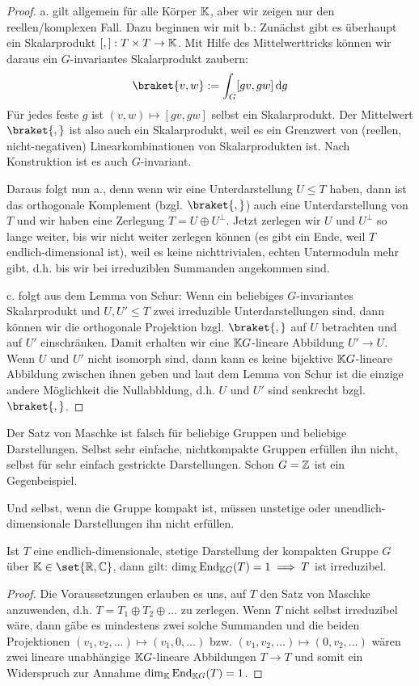 \begin{proof}
a. gilt allgemein für alle Körper $\mathbb{K}$, aber wir zeigen nur den reellen/komplexen Fall. Dazu beginnen wir mit b.: Zunächst gibt es überhaupt ein Skalarprodukt $[,]: T\times T\to\mathbb{K}$. Mit Hilfe des Mittelwerttricks können wir daraus ein $G$-invariantes Skalarprodukt zaubern:
\[\braket{v,w} := \int_G [gv,gw] \dd g\]
Für jedes feste $g$ ist $(v,w) \mapsto [gv,gw]$ selbst ein Skalarprodukt. Der Mittelwert $\braket{,}$ ist also auch ein Skalarprodukt, weil es ein Grenzwert von (reellen, nicht-negativen) Linearkombinationen von Skalarprodukten ist. Nach Konstruktion ist es auch $G$-invariant.

\smallbreak
Daraus folgt nun a., denn wenn wir eine Unterdarstellung $U\leq T$ haben, dann ist das orthogonale Komplement (bzgl. $\braket{,}$) auch eine Unterdarstellung von $T$ und wir haben eine Zerlegung $T=U\oplus U^\perp$. Jetzt zerlegen wir $U$ und $U^\perp$ so lange weiter, bis wir nicht weiter zerlegen können (es gibt ein Ende, weil $T$ endlich-dimensional ist), weil es keine nichttrivialen, echten Untermoduln mehr gibt, d.h. bis wir bei irreduziblen Summanden angekommen sind.

\smallbreak
c. folgt aus dem Lemma von Schur: Wenn ein beliebiges $G$-invariantes Skalarprodukt und $U,U'\leq T$ zwei irreduzible Unterdarstellungen sind, dann können wir die orthogonale Projektion bzgl. $\braket{,}$ auf $U$ betrachten und auf $U'$ einschränken. Damit erhalten wir eine $\mathbb{K} G$-lineare Abbildung $U'\to U$. Wenn $U$ und $U'$ nicht isomorph sind, dann kann es keine bijektive $\mathbb{K} G$-lineare Abbildung zwischen ihnen geben und laut dem Lemma von Schur ist die einzige andere Möglichkeit die Nullabbldung, d.h. $U$ und $U'$ sind senkrecht bzgl. $\braket{,}$.
\end{proof}

\begin{remark}
Der Satz von Maschke ist falsch für beliebige Gruppen und beliebige Darstellungen. Selbst sehr einfache, nichtkompakte Gruppen erfüllen ihn nicht, selbst für sehr einfach gestrickte Darstellungen. Schon $G=\mathbb{Z}$ ist ein Gegenbeispiel.

Und selbst, wenn die Gruppe kompakt ist, müssen unstetige oder unendlich-dimensionale Darstellungen ihn nicht erfüllen.
\end{remark}

\begin{corollary}\label{darstellungen:schur_umkehrung}
Ist $T$ eine endlich-dimensionale, stetige Darstellung der kompakten Gruppe $G$ über $\IK\in\set{\IR,\IC}$, dann gilt: $\dim_{\mathbb{K}} \operatorname{End}_{\mathbb{K} G}(T) = 1 \implies T$ ist irreduzibel.
\end{corollary}
\begin{proof}
Die Voraussetzungen erlauben es uns, auf $T$ den Satz von Maschke anzuwenden, d.h. $T=T_1\oplus T_2\oplus ...$ zu zerlegen. Wenn $T$ nicht selbst irreduzibel wäre, dann gäbe es mindestens zwei solche Summanden und die beiden Projektionen $(v_1,v_2, ...) \mapsto (v_1,0,\ldots)$ bzw. $(v_1,v_2,\ldots)\mapsto (0,v_2,\ldots)$ wären zwei lineare unabhängige $\mathbb{K} G$-lineare Abbildungen $T\to T$ und somit ein Widerspruch zur Annahme $\dim_{\mathbb{K}} \operatorname{End}_{\mathbb{K} G}(T)=1$.
\end{proof}

